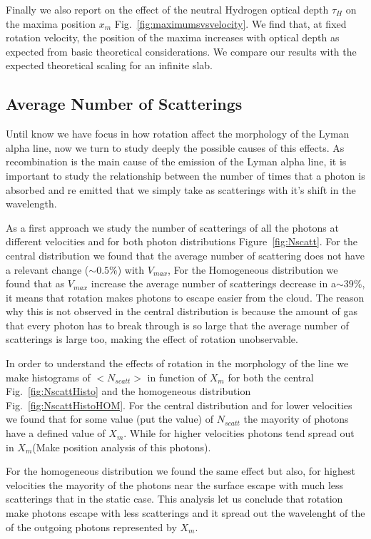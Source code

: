 \documentclass[usenatbib]{mn2e}
\begin{document}
Finally we also report on the effect of the neutral Hydrogen
optical depth $\tau_{H}$ on the maxima position $x_{m}$
Fig.~\ref{fig:maximumsvsvelocity}. We find that, at fixed
rotation velocity, the position of the maxima increases with optical
depth as expected from basic theoretical considerations. We compare
our results with the expected theoretical scaling for an infinite
slab. 




\subsection{Average Number of Scatterings}

Until know we have focus in how rotation affect the morphology of the 
Lyman alpha line, now we turn to study deeply the possible causes of 
this effects. As recombination is the main cause of the emission of the 
Lyman alpha line, it is important to study the relationship between the 
number of times that a photon is absorbed and re emitted that we simply 
take as scatterings with it's shift in the wavelength. 

As a first approach we study the number of scatterings of all the photons 
at different velocities and for both photon distributions Figure~\ref{fig:Nscatt}. 
For the central distribution we found that the average number of scattering 
does not have a relevant change ($\sim 0.5\%$) with $V_{max}$, For the 
Homogeneous distribution we found that as $V_{max}$ increase the average 
number of scatterings decrease in a$\sim 39\%$, it means that rotation 
makes photons to escape easier from the cloud. The reason why this is not 
observed in the central distribution is because the amount of gas that every 
photon has to break through is so large that the average number of scatterings 
is large too, making the effect of rotation unobservable.

In order to understand the effects of rotation in the morphology of the line
 we make histograms of $<N_{scatt}>$  in function of $X_{m}$ for both the 
 central Fig.~\ref{fig:NscattHisto} and the  homogeneous distribution 
 Fig.~\ref{fig:NscattHistoHOM}. For the central distribution and for lower 
 velocities we found that for some value (put the value) of $N_{scatt}$ the 
 mayority of photons have a defined value of $X_{m}$. While for higher 
 velocities photons tend spread out in $X_{m}$(Make position analysis of 
 this photons).

For the homogeneous distribution we found the same effect but also, for 
highest velocities the mayority of the photons near the surface escape 
with much less scatterings that in the static case. This analysis let us 
conclude that rotation make photons escape with less scatterings and it 
spread out the wavelenght of the of the outgoing photons represented by $X_{m}$.
\end{document}
